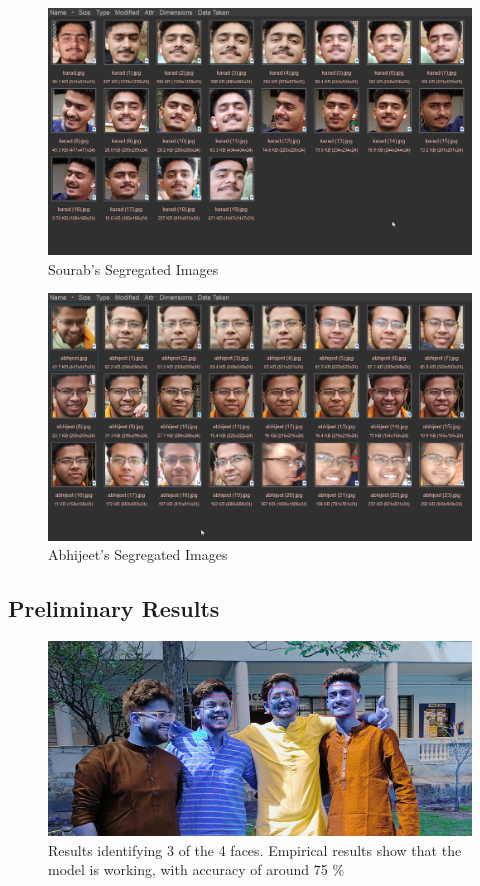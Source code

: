 \documentclass[openany]{report}
\begin{document}
\begin{figure}[H]
    \centering
    \includegraphics[width=.95\textwidth]{../imgs/sourab.png}
    \caption{Sourab's Segregated Images}
\end{figure}

\begin{figure}[H]
    \centering
    \includegraphics[width=.95\textwidth]{../imgs/abhijeet.png}
    \caption{Abhijeet's Segregated Images}
\end{figure}


\subsection{Preliminary Results}
\begin{figure}[H]
    \centering
    \includegraphics[width=.95\textwidth]{../imgs/face rec results cropped.jpg}
    \caption{Results identifying 3 of the 4 faces. Empirical results show that the model is working, with accuracy of around 75 \%}
\end{figure}
\end{document}
